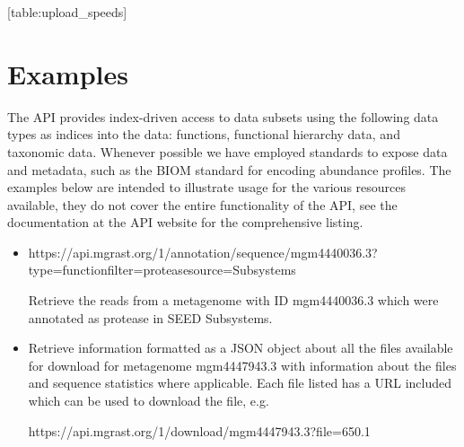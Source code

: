 \documentclass[letterpaper,10pt,english]{sphinxmanual}
\begin{document}
{[}table:upload\_speeds{]}


\section{Examples}
\label{\detokenize{api:examples}}
The API provides index-driven access to data subsets using the following
data types as indices into the data: functions, functional hierarchy
data, and taxonomic data. Whenever possible we have employed standards
to expose data and metadata, such as the BIOM standard for encoding
abundance profiles. The examples below are intended to illustrate usage
for the various resources available, they do not cover the entire
functionality of the API, see the documentation at the API website for
the comprehensive listing.
\begin{itemize}
\item {} 

\begin{sphinxVerbatim}[commandchars=\\\{\}]
https://api.mg\PYGZhy{}rast.org/1/annotation/sequence/mgm4440036.3?type=function\PYGZam{}filter=protease\PYGZam{}source=Subsystems
\end{sphinxVerbatim}

Retrieve the reads from a metagenome with ID mgm4440036.3 which were
annotated as protease in SEED Subsystems.

\item {} 

\begin{sphinxVerbatim}[commandchars=\\\{\}]
\end{sphinxVerbatim}

Retrieve information formatted as a JSON object about all the files
available for download for metagenome mgm4447943.3 with information
about the files and sequence statistics where applicable. Each file
listed has a URL included which can be used to download the file,
e.g.

\begin{sphinxVerbatim}[commandchars=\\\{\}]
https://api.mg\PYGZhy{}rast.org/1/download/mgm4447943.3?file=650.1
\end{sphinxVerbatim}


\end{itemize}
\end{document}
